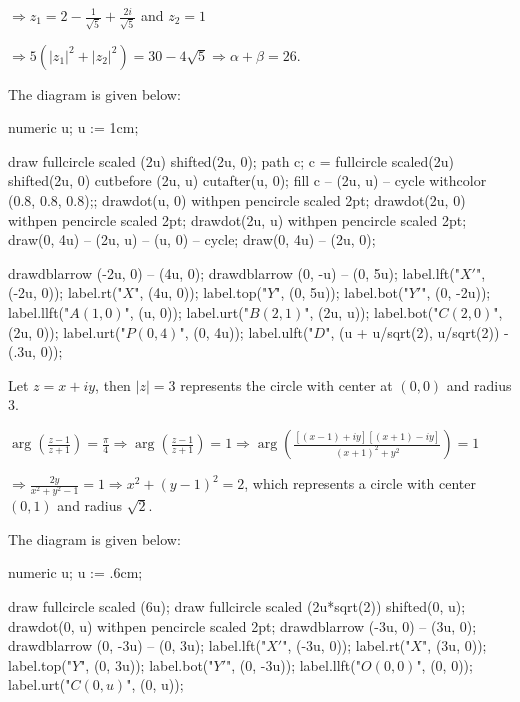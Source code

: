   $\Rightarrow z_1 = 2 - \frac{1}{\sqrt{5}} + \frac{2i}{\sqrt{5}}$ and $z_2 = 1$

  $\Rightarrow 5(|z_1|^2 + |z_2|^2) = 30 - 4\sqrt{5}\Rightarrow \alpha + \beta = 26$.

  The diagram is given below:

  \startplacefigure[location=force]
    \startMPcode
      numeric u;
      u := 1cm;

      draw fullcircle scaled (2u) shifted(2u, 0);
      path c;
      c = fullcircle scaled(2u) shifted(2u, 0) cutbefore (2u, u) cutafter(u, 0);
      fill c -- (2u, u) -- cycle withcolor (0.8, 0.8, 0.8);;
      drawdot(u, 0) withpen pencircle scaled 2pt;
      drawdot(2u, 0) withpen pencircle scaled 2pt;
      drawdot(2u, u) withpen pencircle scaled 2pt;
      draw(0, 4u) -- (2u, u) -- (u, 0) -- cycle;
      draw(0, 4u) -- (2u, 0);

      drawdblarrow (-2u, 0) -- (4u, 0);
      drawdblarrow (0, -u) -- (0, 5u);
      label.lft("$X'$", (-2u, 0));
      label.rt("$X$", (4u, 0));
      label.top("$Y$", (0, 5u));
      label.bot("$Y'$", (0, -2u));
      label.llft("$A(1, 0)$", (u, 0));
      label.urt("$B(2, 1)$", (2u, u));
      label.bot("$C(2, 0)$", (2u, 0));
      label.urt("$P(0, 4)$", (0, 4u));
      label.ulft("$D$", (u + u/sqrt(2), u/sqrt(2)) - (.3u, 0));
    \stopMPcode
  \stopplacefigure
\item Let $z = x + iy$, then $|z| = 3$ represents the circle with center at $(0, 0)$ and radius $3$.

  $\arg\left(\frac{z - 1}{z + 1}\right) = \frac{\pi}{4} \Rightarrow \arg\left(\frac{z - 1}{z + 1}\right) =
  1 \Rightarrow \arg\left(\frac{[(x - 1) + iy][(x + 1) - iy]}{(x + 1)^2 + y^2}\right) = 1$

  $\Rightarrow \frac{2y}{x^2 + y^2 - 1} = 1\Rightarrow x^2 + (y - 1)^2 = 2$, which represents a circle with
  center $(0, 1)$ and radius $\sqrt{2}$.

  The diagram is given below:

  \startplacefigure[location=force]
    \startMPcode
      numeric u;
      u := .6cm;

      draw fullcircle scaled (6u);
      draw fullcircle scaled (2u*sqrt(2)) shifted(0, u);
      drawdot(0, u) withpen pencircle scaled 2pt;
      drawdblarrow (-3u, 0) -- (3u, 0);
      drawdblarrow (0, -3u) -- (0, 3u);
      label.lft("$X'$", (-3u, 0));
      label.rt("$X$", (3u, 0));
      label.top("$Y$", (0, 3u));
      label.bot("$Y'$", (0, -3u));
      label.llft("$O(0, 0)$", (0, 0));
      label.urt("$C(0, u)$", (0, u));
    \stopMPcode
  \stopplacefigure

